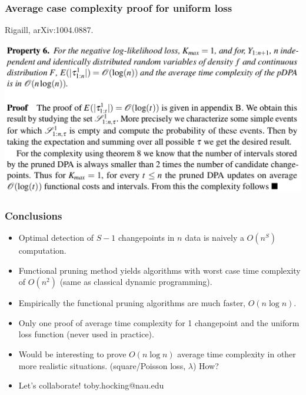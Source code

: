 \documentclass{beamer}
\begin{document}
\begin{frame}
  \frametitle{Average case complexity proof for uniform loss}
  Rigaill, arXiv:1004.0887.
  
  \includegraphics[width=\textwidth]{screenshot-proposition-6}
\end{frame} 

\begin{frame}[fragile]
  \frametitle{Conclusions}

  \begin{itemize}
  \item Optimal detection of $S-1$ changepoints in $n$ data is naively
    a $O(n^S)$ computation.  
  \item Functional pruning method yields algorithms with worst case
    time complexity of $O(n^2)$ (same as classical dynamic
    programming).
  \item Empirically the functional pruning algorithms are much faster,
    $O(n\log n)$.
  \item Only one proof of average time complexity for 1 changepoint
    and the uniform loss function (never used in practice).
  \item Would be interesting to prove $O(n\log n)$ average time complexity in
    other more realistic situations. (square/Poisson loss, $\lambda$) How?
  \item Let's collaborate! toby.hocking@nau.edu
  \end{itemize}
  
\end{frame}
\end{document}
